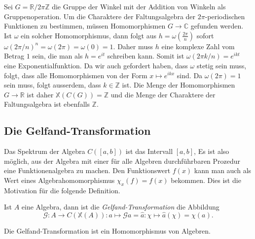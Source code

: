 \begin{beispiel}
\label{buch:gruppen:gelfand:bsp:winkel}
Sei $G= \mathbb{R}/2\pi\mathbb{Z}$ die Gruppe der Winkel mit der 
Addition von Winkeln als Gruppenoperation.
Um die Charaktere der Faltungsalgebra der $2\pi$-periodischen Funktionen
zu bestimmen, müssen Homomorphismen $G\to\mathbb{C}$ gefunden werden.
Ist $\omega$ ein solcher Homomorphismus, dann folgt aus
$h=\omega(\frac{2\pi}{n})$ sofort
$\omega(2\pi/n)^n = \omega(2\pi)=\omega(0)=1$.
Daher muss $h$ eine komplexe Zahl vom Betrag $1$ sein, die man als
$h=e^{it}$ schreiben kann.
Somit ist $\omega(2\pi k/n) = e^{ikt}$ eine Exponentialfunktion.
Da wir auch gefordert haben, dass $\omega$ stetig sein muss, folgt,
dass alle Homomorphismen von der Form $x\mapsto e^{ikx}$ sind.
Da $\omega(2\pi)=1$ sein muss, folgt ausserdem, dass $k\in \mathbb{Z}$
ist.
Die Menge der Homomorphismen $G\to\mathbb{R}$ ist daher
$\mathbb{X}(C(G)) = \mathbb{Z}$ und
die Menge der Charaktere der Faltungsalgebra ist ebenfalls $\mathbb{Z}$.
\end{beispiel}


%
%
\subsection{Die Gelfand-Transformation}
Das Spektrum der Algebra $C([a,b])$ ist das Intervall $[a,b]$,
Es ist also möglich, aus der Algebra mit einer für alle Algebren
durchführbaren Prozedur eine Funktionenalgebra zu machen.
Den Funktionswert $f(x)$  kann man auch als Wert eines 
Algebrahomomorphismus $\chi_x(f) = f(x)$ bekommen.
Dies ist die Motivation für die folgende Definition.

\begin{definition}
Ist $A$ eine Algebra, dann ist die {\em Gelfand-Transformation}
die Abbildung
\[
\mathscr{G}
\colon
A \to C(\mathbb{X}(A))
:
a
\mapsto \mathscr{G}a = \hat{a}
\colon \chi \mapsto \hat{a}(\chi) = \chi(a).
\]
\end{definition}

\begin{satz}
Die Gelfand-Transformation ist ein Homomorphismus von Algebren.
\end{satz}

